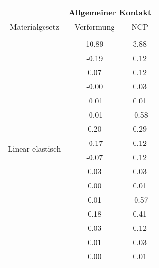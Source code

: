 \begin{table} 
\centering 
\begin{tabular}{c|cc|} 
\cline{2-3} 
 & \multicolumn{2}{|c|}{Allgemeiner Kontakt} \\ 
\hline 
\multicolumn{1}{|c|}{Materialgesetz} & \multicolumn{1}{c|}{Verformung} & \multicolumn{1}{c|}{NCP} \\ 
\hline 
\multicolumn{1}{|c|}{\multirow{101}{*}{Linear elastisch}} &\multicolumn{1}{|c|}{} & \multicolumn{1}{|c|}{} \\ 
\multicolumn{1}{|c|}{} & \multicolumn{1}{|c|}{     10.89} & \multicolumn{1}{|c|}{      3.88} \\ 
\multicolumn{1}{|c|}{} & \multicolumn{1}{|c|}{     -0.19} & \multicolumn{1}{|c|}{      0.12} \\ 
\multicolumn{1}{|c|}{} & \multicolumn{1}{|c|}{      0.07} & \multicolumn{1}{|c|}{      0.12} \\ 
\multicolumn{1}{|c|}{} & \multicolumn{1}{|c|}{     -0.00} & \multicolumn{1}{|c|}{      0.03} \\ 
\multicolumn{1}{|c|}{} & \multicolumn{1}{|c|}{     -0.01} & \multicolumn{1}{|c|}{      0.01} \\ 
\multicolumn{1}{|c|}{} & \multicolumn{1}{|c|}{     -0.01} & \multicolumn{1}{|c|}{     -0.58} \\ 
\multicolumn{1}{|c|}{} & \multicolumn{1}{|c|}{      0.20} & \multicolumn{1}{|c|}{      0.29} \\ 
\multicolumn{1}{|c|}{} & \multicolumn{1}{|c|}{     -0.17} & \multicolumn{1}{|c|}{      0.12} \\ 
\multicolumn{1}{|c|}{} & \multicolumn{1}{|c|}{     -0.07} & \multicolumn{1}{|c|}{      0.12} \\ 
\multicolumn{1}{|c|}{} & \multicolumn{1}{|c|}{      0.03} & \multicolumn{1}{|c|}{      0.03} \\ 
\multicolumn{1}{|c|}{} & \multicolumn{1}{|c|}{      0.00} & \multicolumn{1}{|c|}{      0.01} \\ 
\multicolumn{1}{|c|}{} & \multicolumn{1}{|c|}{      0.01} & \multicolumn{1}{|c|}{     -0.57} \\ 
\multicolumn{1}{|c|}{} & \multicolumn{1}{|c|}{      0.18} & \multicolumn{1}{|c|}{      0.41} \\ 
\multicolumn{1}{|c|}{} & \multicolumn{1}{|c|}{      0.03} & \multicolumn{1}{|c|}{      0.12} \\ 
\multicolumn{1}{|c|}{} & \multicolumn{1}{|c|}{      0.01} & \multicolumn{1}{|c|}{      0.03} \\ 
\multicolumn{1}{|c|}{} & \multicolumn{1}{|c|}{      0.00} & \multicolumn{1}{|c|}{      0.01} \\ 

\end{tabular}
\end{table}
